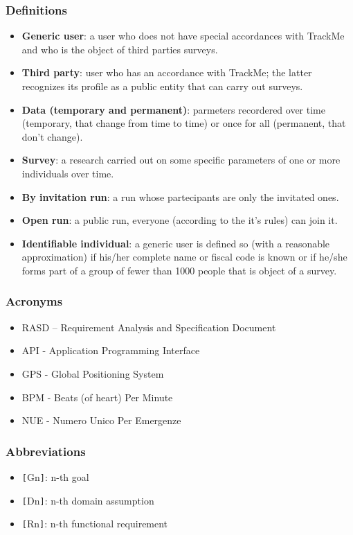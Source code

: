 \subsubsection{Definitions}
\begin{itemize}
\item \textbf{Generic user}: a user who does not have special accordances with TrackMe and who is the object of third parties surveys.
\item \textbf{Third party}: user who has an accordance with TrackMe; the latter recognizes its profile as a public entity that can carry out surveys.
\item \textbf{Data (temporary and permanent)}: parmeters recordered over time (temporary, that change from time to time) or once for all (permanent, that don't change).
\item \textbf{Survey}: a research carried out on some specific parameters of one or more individuals over time.
\item \textbf{By invitation run}: a run whose partecipants are only the invitated ones.
\item \textbf{Open run}: a public run, everyone (according to the it's rules) can join it.
\item \textbf{Identifiable individual}: a generic user is defined so (with a reasonable approximation) if his/her complete name or fiscal code is known or if he/she forms part of a group of fewer than 1000 people that is object of a survey.
\end{itemize}
\subsubsection{Acronyms}
\begin{itemize}
\item RASD – Requirement Analysis and Specification Document
\item API - Application Programming Interface
\item GPS - Global Positioning System
\item BPM - Beats (of heart) Per Minute
\item NUE - Numero Unico Per Emergenze
\end{itemize}
\subsubsection{Abbreviations}
\begin{itemize}
\item \verb|[|Gn\verb|]|: n-th goal
\item \verb|[|Dn\verb|]|: n-th domain assumption
\item \verb|[|Rn\verb|]|: n-th functional requirement
\end{itemize}

